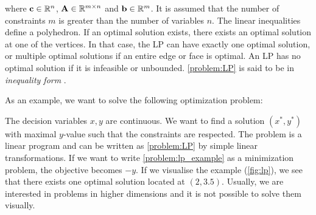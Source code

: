 
\quad where $\bold c \in \mathbb{R}^n$, $ \bold A \in \mathbb{R}^{m \times n}$ and $\bold b \in \mathbb{R}^m$. It is assumed that the number of constraints $m$ is greater than the number of variables $n$. %
The linear inequalities define a polyhedron. If an optimal solution exists, there exists an optimal solution at one of the vertices.  In that case, the LP can have exactly one optimal solution, or multiple optimal solutions if an entire edge or face  is optimal. An LP has no optimal solution if it is infeasible or unbounded.
\cref{problem:LP} is said to be in \textit{inequality form}%
.

As an example, we want to solve the following optimization problem: 
The decision variables $x, y$ are continuous. We want to find a solution $(x^*, y^*)$ with maximal $y$-value such that the constraints are respected. The problem is a linear program and can be written as \cref{problem:LP} by simple linear transformations. If we want to write \cref{problem:lp_example} as a minimization problem, the objective becomes $-y$. If we visualise the example (\cref{fig:lp}), we see that there exists one optimal solution located at $(2,3.5)$. Usually, we are interested in problems in higher dimensions and it is not possible to solve them visually.

